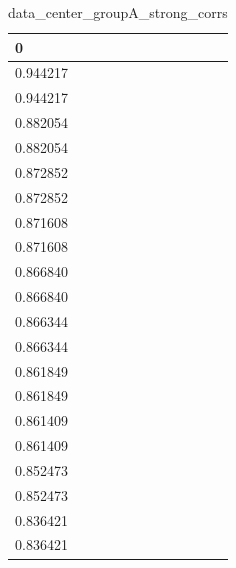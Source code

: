 \begin{table}
\caption{data_center_groupA_strong_corrs}
\label{tab:data_summary}
\begin{tabular}{lcr}
\toprule
0 \\
\midrule
0.944217 \\
0.944217 \\
0.882054 \\
0.882054 \\
0.872852 \\
0.872852 \\
0.871608 \\
0.871608 \\
0.866840 \\
0.866840 \\
0.866344 \\
0.866344 \\
0.861849 \\
0.861849 \\
0.861409 \\
0.861409 \\
0.852473 \\
0.852473 \\
0.836421 \\
0.836421 \\
\bottomrule
\end{tabular}
\end{table}
